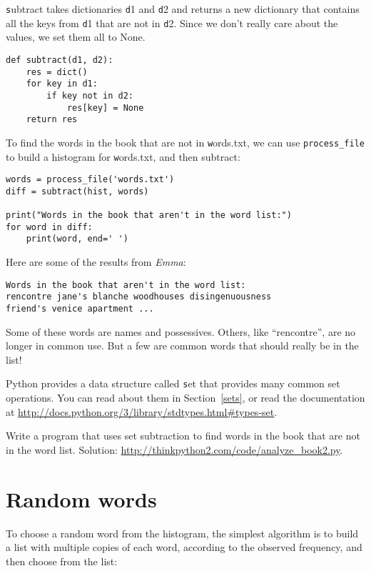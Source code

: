 \documentclass[
DIV=11,
fontsize=13,
twoside,
headinclude=false,
titlepage=firstiscover,
abstract=true,
headsepline=true,
footsepline=true,
chapterprefix=true, %
headings=big,
bibliography=totoc,%
captions=tableheading
]{scrbook}
\theoremstyle{definition}
\begin{document}
{\texttt subtract} takes dictionaries {\texttt d1} and {\texttt d2} and returns a
new dictionary that contains all the keys from {\texttt d1} that are not
in {\texttt d2}.  Since we don't really care about the values, we
set them all to None.

\begin{lstlisting}
def subtract(d1, d2):
    res = dict()
    for key in d1:
        if key not in d2:
            res[key] = None
    return res
\end{lstlisting}
%
To find the words in the book that are not in {\texttt words.txt},
we can use \verb"process_file" to build a histogram for
{\texttt words.txt}, and then subtract:

\begin{lstlisting}
words = process_file('words.txt')
diff = subtract(hist, words)

print("Words in the book that aren't in the word list:")
for word in diff:
    print(word, end=' ')
\end{lstlisting}
%
Here are some of the results from {\em Emma}:

\begin{lstlisting}
Words in the book that aren't in the word list:
rencontre jane's blanche woodhouses disingenuousness 
friend's venice apartment ...
\end{lstlisting}
%
Some of these words are names and possessives.  Others, like
``rencontre'', are no longer in common use.  But a few are common
words that should really be in the list!

\begin{exercise}
\normalfont
{}

Python provides a data structure called {\texttt set} that provides many
common set operations.  You can read about them in Section~\ref{sets},
or read the documentation at
\url{http://docs.python.org/3/library/stdtypes.html#types-set}.

Write a program that uses set subtraction to find words in the book
that are not in the word list.  Solution:
\url{http://thinkpython2.com/code/analyze_book2.py}.

\end{exercise}


\section{Random words}
\label{randomwords}

To choose a random word from the histogram, the simplest algorithm
is to build a list with multiple copies of each word, according
to the observed frequency, and then choose from the list:
\end{document}
